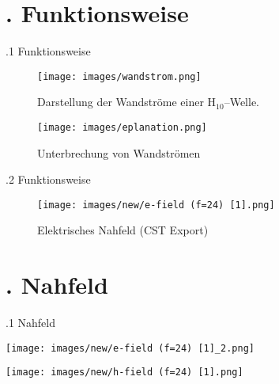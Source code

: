 \documentclass[
  aspectratio=169, %
]{beamer}
\begin{document}
\section{\thesection. Funktionsweise}
\begin{frame}{\thesection.1 Funktionsweise}
    \begin{figure}
        \centering
        \begin{minipage}[t]{0.49\textwidth}
            \centering
            \texttt{[image: images/wandstrom.png]}
            \caption{Darstellung der Wandströme einer H$_{10}$–Welle.}
        \end{minipage}
        \hfill
        \begin{minipage}[t]{0.49\textwidth}
            \centering
            \texttt{[image: images/eplanation.png]}
            \caption{Unterbrechung von Wandströmen}
        \end{minipage}
    \end{figure}
\end{frame}


\begin{frame}{\thesection.2 Funktionsweise}
  \begin{figure}
    \centering
    \texttt{[image: images/new/e-field (f=24) [1].png]}
    \caption{Elektrisches Nahfeld (CST Export)}
  \end{figure}
\end{frame}

\section{\thesection. Nahfeld}
\begin{frame}{\thesection.1 Nahfeld}
    \begin{minipage}[t]{0.48\textwidth}
        \centering
        \texttt{[image: images/new/e-field (f=24) [1]\_2.png]}
    \end{minipage}
    \hfill
    \begin{minipage}[t]{0.48\textwidth}
        \centering
        \texttt{[image: images/new/h-field (f=24) [1].png]}
    \end{minipage}
\end{frame}
\end{document}

